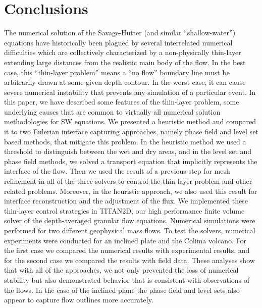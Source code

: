 \documentclass[review]{elsarticle}
\begin{document}
\section{Conclusions} \label{conclusions}
The numerical solution of the Savage-Hutter (and similar 
``shallow-water'') equations have historically been plagued by 
several interrelated numerical difficulties which are collectively characterized by a non-physically thin-layer extending large distances from the realistic main body of the flow. 
In the best case, this ``thin-layer problem'' means a ``no flow'' boundary line must be arbitrarily drawn at some given depth contour.  In 
the worst case, it can cause severe numerical instability that 
prevents any simulation of a particular event.
In this paper, we 
have described some features of the thin-layer problem,
some underlying causes that are common to virtually all numerical 
solution methodologies for SW equations. We presented a heuristic method and compared it to two Eulerian interface capturing approaches, namely phase field and level set
based methods, that 
mitigate this problem. In the heuristic method we used a threshold to distinguish between the wet and dry areas, and in the level set and phase field methods, we solved a 
transport equation that implicitly represents the interface of the flow. Then we used the result of a previous step for mesh refinement in all of the three solvers to control 
the thin layer problem and other related problems. Moreover, in the heuristic approach, we also used this result for interface reconstruction and the adjustment of the flux. 
We implemented these thin-layer control strategies in TITAN2D, our high 
performance finite volume solver of the depth-averaged granular 
flow equations. Numerical simulations were performed for two different geophysical mass flows.
To test the solvers, numerical experiments were conducted for an inclined plate and the Colima volcano. For the first case we compared the numerical results 
with experimental results, and for the second case we compared the results with field data. These analyses show that with all of the approaches,
we not only prevented the loss of numerical stability but also demonstrated behavior that is consistent with observations of the flows. In the case of the inclined plane
the phase field and level sets also appear to capture flow outlines more accurately.
%
\end{document}
